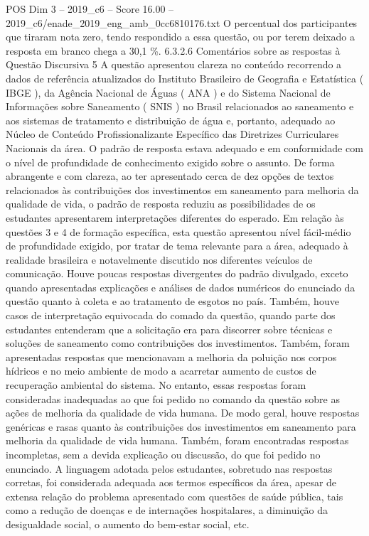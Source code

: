 \begin{textsample}{POS Dim 3 – 2019\_c6 – Score 16.00 – 2019\_c6/enade\_2019\_eng\_amb\_0cc6810176.txt}
O percentual dos participantes que tiraram nota zero, tendo respondido a essa questão, ou por terem deixado a resposta em branco chega a 30,1 \%. 6.3.2.6 Comentários sobre as respostas à Questão Discursiva 5 A questão apresentou clareza no conteúdo recorrendo a dados de referência atualizados do Instituto Brasileiro de Geografia e Estatística ( IBGE ), da Agência Nacional de Águas ( ANA ) e do Sistema Nacional de Informações sobre Saneamento ( SNIS ) no Brasil relacionados ao saneamento e aos sistemas de tratamento e distribuição de água e, portanto, adequado ao Núcleo de Conteúdo Profissionalizante Específico das Diretrizes Curriculares Nacionais da área.
O padrão de resposta estava adequado e em conformidade com o nível de profundidade de conhecimento exigido sobre o assunto.
De forma abrangente e com clareza, ao ter apresentado cerca de dez opções de textos relacionados às contribuições dos investimentos em saneamento para melhoria da qualidade de vida, o padrão de resposta reduziu as possibilidades de os estudantes apresentarem interpretações diferentes do esperado.
Em relação às questões 3 e 4 de formação específica, esta questão apresentou nível fácil-médio de profundidade exigido, por tratar de tema relevante para a área, adequado à realidade brasileira e notavelmente discutido nos diferentes veículos de comunicação.
Houve poucas respostas divergentes do padrão divulgado, exceto quando apresentadas explicações e análises de dados numéricos do enunciado da questão quanto à coleta e ao tratamento de esgotos no país.
Também, houve casos de interpretação equivocada do comado da questão, quando parte dos estudantes entenderam que a solicitação era para discorrer sobre técnicas e soluções de saneamento como contribuições dos investimentos.
Também, foram apresentadas respostas que mencionavam a melhoria da poluição nos corpos hídricos e no meio ambiente de modo a acarretar aumento de custos de recuperação ambiental do sistema.
No entanto, essas respostas foram consideradas inadequadas ao que foi pedido no comando da questão sobre as ações de melhoria da qualidade de vida humana.
De modo geral, houve respostas genéricas e rasas quanto às contribuições dos investimentos em saneamento para melhoria da qualidade de vida humana.
Também, foram encontradas respostas incompletas, sem a devida explicação ou discussão, do que foi pedido no enunciado.
A linguagem adotada pelos estudantes, sobretudo nas respostas corretas, foi considerada adequada aos termos específicos da área, apesar de extensa relação do problema apresentado com questões de saúde pública, tais como a redução de doenças e de internações hospitalares, a diminuição da desigualdade social, o aumento do bem-estar social, etc.

\end{textsample}

